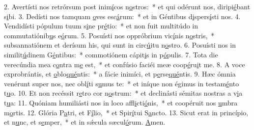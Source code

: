 2. Avertísti nos retrórsum post inim\uline{í}cos n\uline{o}stros:~* et qui odérunt nos, diripi\uline{é}bant s\uline{i}bi.
3. Dedísti nos tamquam \uline{o}ves esc\uline{á}rum:~* et in Géntibus d\uline{i}spers\uline{í}sti nos.
4. Vendidísti pópulum tuum s\uline{i}ne pr\uline{é}tio:~* et non fuit multitúdo in commutatiónib\uline{u}s e\uline{ó}rum.
5. Posuísti nos oppróbrium vic\uline{í}nis n\uline{o}stris,~* subsannatiónem et derísum his, qui sunt in circ\uline{ú}itu n\uline{o}stro.
6. Posuísti nos in similit\uline{ú}dinem G\uline{é}ntibus:~* commotiónem cápit\uline{i}s in p\uline{ó}pulis.
7. Tota die verecúndia mea c\uline{o}ntra m\uline{e} est,~* et confúsio faciéi meæ coop\uline{é}ru\uline{i}t me.
8. A voce exprobrántis, et \uline{o}blo\uline{qué}ntis:~* a fácie inimíci, et p\uline{e}rse\uline{qué}ntis.
9. Hæc ómnia venérunt super nos, nec obl\uline{í}ti s\uline{u}mus te:~* et iníque non égimus in testam\uline{é}nto t\uline{u}o.
10. Et non recéssit r\uline{e}tro cor n\uline{o}strum:~* et declinásti sémitas nostras a v\uline{i}a t\uline{u}a:
11. Quóniam humiliásti nos in loco affl\uline{i}cti\uline{ó}nis,~* et coopéruit nos \uline{u}mbra m\uline{o}rtis.
12. Glória P\uline{a}tri, et F\uline{í}lio,~* et Spir\uline{í}tui S\uline{a}ncto.
13. Sicut erat in princípio, et n\uline{u}nc, et s\uline{e}mper,~* et in sǽcula sæcul\uline{ó}rum. \uline{A}men.

